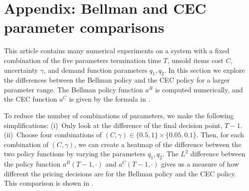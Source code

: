 \documentclass[main.tex]{subfiles}
\begin{document}
\listoftodos

\section*{Appendix: Bellman and CEC parameter comparisons}\label{sec:parameter_comparison}
This article contains many numerical experiments on a system
with a fixed combination of the five parameters
termination time $T$, unsold items cost $C$, uncertainty $\gamma$, and
demand function parameters $q_1,q_2$.
In this section we explore the differences between the Bellman policy
and the CEC policy for a larger parameter range.
The Bellman policy function $a^B$ is computed numerically, and
the CEC function $a^C$ is given by the formula in
.

To reduce the number of combinations of parameters, we make the
following simplifications:
(i)~Only look at the difference of the final decision point, $T-1$.
(ii)~Choose four combinations of
$(C,\gamma)\in\{0.5,1\}\times\{0.05,0.1\}$.
Then,
for each combination of $(C,\gamma)$,
we can create a heatmap of the difference between the two policy
functions by varying the parameters $q_1,q_2$.
The $L^2$ difference between the
policy function $a^B(T-1,\cdot)$ and $a^C(T-1,\cdot)$
gives us a measure of how different the pricing decisions are for
the Bellman policy and the CEC policy.
This comparison is shown in .
\end{document}
